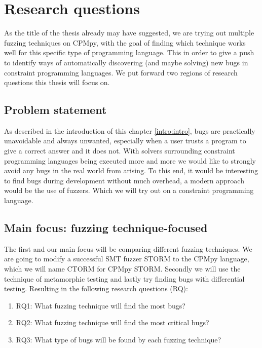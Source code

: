 \section{Research questions}
\label{intro:RQ:RQ’s}
As the title of the thesis already may have suggested, we are trying out multiple fuzzing techniques on CPMpy, with the goal of finding which technique works well for this specific type of programming language. This in order to give a push to identify ways of automatically discovering (and maybe solving) new bugs in constraint programming languages. We put forward two regions of research questions this thesis will focus on.

\subsection{Problem statement}
\label{intro:ProblemStatment}
As described in the introduction of this chapter \ref{intro:intro}, bugs are practically unavoidable and always unwanted, especially when a user trusts a program to give a correct answer and it does not. With solvers surrounding constraint programming languages being executed more and more we would like to strongly avoid any bugs in the real world from arising. To this end, it would be interesting to find bugs during development without much overhead, a modern approach would be the use of fuzzers. Which we will try out on a constraint programming language.

\subsection{Main focus: fuzzing technique-focused}
\label{intro:RQ:MainFocus}
The first and our main focus will be comparing different fuzzing techniques. We are going to modify a successful SMT fuzzer STORM to the CPMpy language, which we will name CTORM for CPMpy STORM. Secondly we will use the technique of metamorphic testing and lastly try finding bugs with differential testing. Resulting in the following research questions (RQ): \newline
\begin{enumerate}
	\item RQ1: What fuzzing technique will find the most bugs?
	\item RQ2: What fuzzing technique will find the most critical bugs?
	\item RQ3: What type of bugs will be found by each fuzzing technique?
\end{enumerate}

